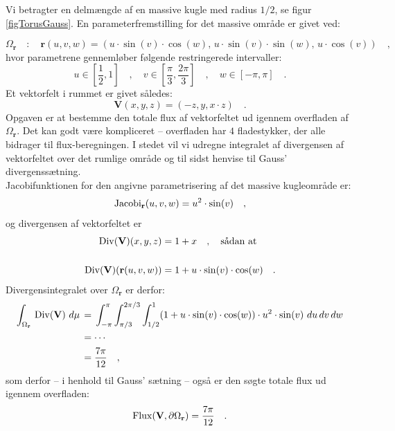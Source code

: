 \begin{example}\label{exampTorusGauss}
Vi betragter en delmængde af en massive kugle med radius $1/2$, se figur \ref{figTorusGauss}.
En parameterfremstilling for det massive område er givet ved:

\begin{equation}
\Omega_{\mathbf{r}} \quad : \quad \mathbf{r}(u,v,w) = (u\cdot \sin(v)\cdot \cos(w), \, u\cdot \sin(v)\cdot \sin(w), \, u \cdot \cos(v) ) \quad ,
\end{equation}
hvor parametrene gennemløber følgende  restringerede intervaller:
\begin{equation}
u \in \left[\frac{1}{2}, 1 \right]\quad , \quad v \in \left[ \frac{\pi}{3}, \frac{2\pi}{3} \right]\quad , \quad w \in \left[-\pi, \pi \right]\quad .
\end{equation}
Et vektorfelt i rummet er givet således:
\begin{equation}
\mathbf{V}(x,y,z) = (-z, y, x\cdot z) \quad .
\end{equation}
Opgaven er at bestemme den totale flux af vektorfeltet ud igennem overfladen af $\Omega_{\mathbf{r}}$.
Det kan godt være kompliceret -- overfladen har $4$ fladestykker, der alle bidrager til flux-beregningen. I stedet vil vi udregne integralet af divergensen af vektorfeltet over det rumlige område og til sidst henvise til Gauss' divergenssætning.\\

Jacobifunktionen for den angivne parametrisering af det massive kugleområde er:
\begin{equation}
\operatorname{Jacobi}_{\mathbf{r}}(u,v,w) = u^{2}\cdot \sin(v) \quad,
\end{equation}
og divergensen af vektorfeltet er
\begin{equation}
\begin{aligned}
\operatorname{Div}(\mathbf{V})(x,y,z) &=  1 + x  \quad , \quad  \textrm{sådan at}\\ \\
\operatorname{Div}(\mathbf{V})(\mathbf{r}(u,v,w)) &=  1 +  u\cdot \sin(v)\cdot \cos(w) \quad.
\end{aligned}
\end{equation}
Divergensintegralet over $\Omega_{\mathbf{r}}$ er derfor:
\begin{equation}
\begin{aligned}
\int_{\Omega_{\bf{r}}} \, \operatorname{Div}({\bf{V}}) \,\,
d\mu \, &= \, \int_{-\pi}^{\pi} \int_{\pi/3}^{2\pi/3} \int_{1/2}^{1}(1+ u\cdot \sin(v)\cdot \cos(w))\cdot u^{2}\cdot \sin(v)\,\, du\,dv\,dw \\
&= \cdots \\
& = \frac{7\pi}{12} \quad ,
\end{aligned}
\end{equation}
som derfor -- i henhold til Gauss' sætning -- også er den søgte totale flux ud igennem overfladen:
\begin{equation}
\operatorname{Flux}(\mathbf{V}, \partial \Omega_{\bf{r}}) = \frac{7\pi}{12} \quad.
\end{equation}
\end{example}


